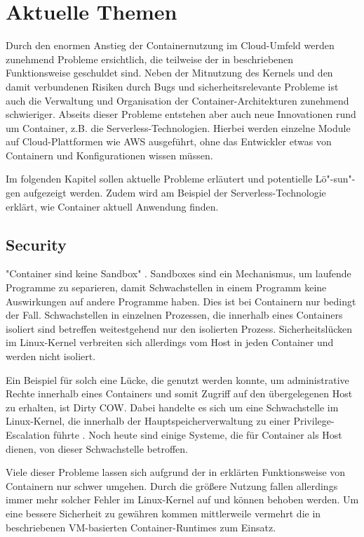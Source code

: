 \chapter{Aktuelle Themen}
\label{chap:aktuelles}

Durch den enormen Anstieg der Containernutzung im Cloud-Umfeld werden zunehmend Probleme ersichtlich, die teilweise der in  beschriebenen Funktionsweise geschuldet sind. Neben der Mitnutzung des Kernels und den damit verbundenen Risiken durch Bugs und sicherheitsrelevante Probleme ist auch die Verwaltung und Organisation der Container-Architekturen zunehmend schwieriger. Abseits dieser Probleme entstehen aber auch neue Innovationen rund um Container, z.B. die Serverless-Technologien. Hierbei werden einzelne Module auf Cloud-Plattformen wie AWS ausgeführt, ohne das Entwickler etwas von Containern und Konfigurationen wissen müssen.

Im folgenden Kapitel sollen aktuelle Probleme erläutert und potentielle Lö"-sun"-gen aufgezeigt werden. Zudem wird am Beispiel der Serverless-Technologie erklärt, wie Container aktuell Anwendung finden.

\section{Security}
\label{sec:aktuellesSecurity}

"Container sind keine Sandbox" \citep{OpenSourcingGVisoraSandboxedContainerRuntime}. Sandboxes sind ein Mechanismus, um laufende Programme zu separieren, damit Schwachstellen in einem Programm keine Auswirkungen auf andere Programme haben. Dies ist bei Containern nur bedingt der Fall. Schwachstellen in einzelnen Prozessen, die innerhalb eines Containers isoliert sind betreffen weitestgehend nur den isolierten Prozess. Sicherheitslücken im Linux-Kernel verbreiten sich allerdings vom Host in jeden Container und werden nicht isoliert.

Ein Beispiel für solch eine Lücke, die genutzt werden konnte, um administrative Rechte innerhalb eines Containers und somit Zugriff auf den übergelegenen Host zu erhalten, ist Dirty COW. Dabei handelte es sich um eine Schwachstelle im Linux-Kernel, die innerhalb der Hauptspeicherverwaltung zu einer Privilege-Escalation führte \citep{DirtyCOWCVE20165195}. Noch heute sind einige Systeme, die für Container als Host dienen, von dieser Schwachstelle betroffen.

Viele dieser Probleme lassen sich aufgrund der in  erklärten Funktionsweise von Containern nur schwer umgehen. Durch die größere Nutzung fallen allerdings immer mehr solcher Fehler im Linux-Kernel auf und können behoben werden. Um eine bessere Sicherheit zu gewähren kommen mittlerweile vermehrt die in  beschriebenen VM-basierten Container-Runtimes zum Einsatz.

